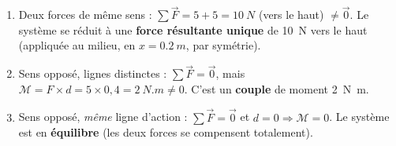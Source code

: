 \documentclass[11pt,a4paper]{article}
\newcommand{\vv}[1]{\vec{#1}}\newcommand{\ds}{\displaystyle}
\begin{document}
\begin{corrige}
\begin{enumerate}[label=\alph*)]
  \item Deux forces de même sens : $\sum\vv F = 5+5 = \qty{10}{N}$ (vers le haut) $\neq\vv 0$. Le
        système se réduit à une \textbf{force résultante unique} de \qty{10}{N} vers le haut (appliquée
        au milieu, en $x=\qty{0.2}{m}$, par symétrie).
  \item Sens opposé, lignes distinctes : $\sum\vv F=\vv 0$, mais $\mathcal{M}=F\times d=5\times 0{,}4
        =\qty{2}{N.m}\neq 0$. C'est un \textbf{couple} de moment \qty{2}{N.m}.
  \item Sens opposé, \emph{même} ligne d'action : $\sum\vv F=\vv 0$ et $d=0\Rightarrow\mathcal{M}=0$.
        Le système est en \textbf{équilibre} (les deux forces se compensent totalement).
\end{enumerate}
\end{corrige}
\end{document}
